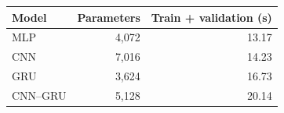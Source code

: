 \begin{tabular}{lrr}
\toprule
Model & Parameters & Train + validation (s) \\
\midrule
MLP & 4,072 & 13.17 \\
CNN & 7,016 & 14.23 \\
GRU & 3,624 & 16.73 \\
CNN--GRU & 5,128 & 20.14 \\
\bottomrule
\end{tabular}
